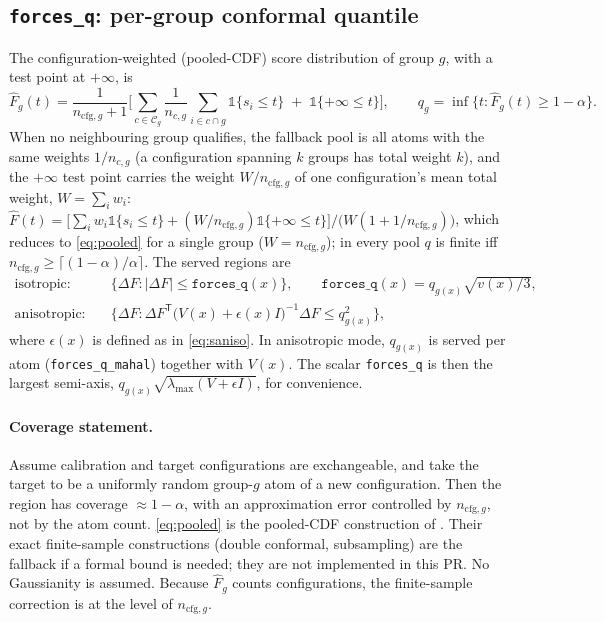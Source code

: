 \documentclass[11pt,a4paper]{article}
\newcommand{\T}{\mathsf{T}}
\newcommand{\ncfg}{n_{\mathrm{cfg},g}}
\newcommand{\code}[1]{\texttt{#1}}
\begin{document}
\subsection{\code{forces\_q}: per-group conformal quantile}
The configuration-weighted (pooled-CDF) score distribution of group $g$, with a test point at
$+\infty$, is
\begin{equation}
\hat F_g(t)=\frac{1}{\ncfg+1}\Bigg[\sum_{c\in\mathcal{C}_g}\frac{1}{n_{c,g}}\sum_{i\in c\cap g}
\mathbb{1}\{s_i\le t\}\;+\;\mathbb{1}\{+\infty\le t\}\Bigg],
\qquad q_g=\inf\{t:\hat F_g(t)\ge1-\alpha\}.
\label{eq:pooled}
\end{equation}
When no neighbouring group qualifies, the fallback pool is all atoms with the same weights $1/n_{c,g}$
(a configuration spanning $k$ groups has total weight $k$), and the $+\infty$ test point carries the weight
$W/\ncfg$ of one configuration's mean total weight, $W=\sum_i w_i$:
$\hat F(t)=\big[\sum_i w_i\mathbb{1}\{s_i\le t\}+(W/\ncfg)\mathbb{1}\{+\infty\le t\}\big]/\big(W(1+1/\ncfg)\big)$,
which reduces to \eqref{eq:pooled} for a single group ($W=\ncfg$); in every pool $q$ is finite iff
$\ncfg\ge\lceil(1-\alpha)/\alpha\rceil$.
The served regions are
\begin{align}
\text{isotropic:}\quad & \{\Delta F: |\Delta F|\le \code{forces\_q}(x)\},\qquad
\code{forces\_q}(x)=q_{g(x)}\sqrt{v(x)/3},\\
\text{anisotropic:}\quad & \big\{\Delta F:\Delta F^\T\big(V(x)+\epsilon(x)I\big)^{-1}\Delta F\le q_{g(x)}^2\big\},
\end{align}
where $\epsilon(x)$ is defined as in \eqref{eq:saniso}. In anisotropic mode, $q_{g(x)}$ is served
per atom (\code{forces\_q\_mahal}) together with $V(x)$. The scalar \code{forces\_q} is then the largest
semi-axis, $q_{g(x)}\sqrt{\lambda_{\max}(V+\epsilon I)}$, for convenience.

\paragraph{Coverage statement.} Assume calibration and target configurations are exchangeable, and
take the target to be a uniformly random group-$g$ atom of a new configuration. Then the region has
coverage $\approx1-\alpha$, with an approximation error controlled by $\ncfg$, not by the atom count.
\eqref{eq:pooled} is the pooled-CDF construction of \cite{dunn2023}. Their exact finite-sample
constructions (double conformal, subsampling) are the fallback if a formal bound is needed; they
are not implemented in this PR. No Gaussianity is assumed. Because $\hat F_g$ counts configurations,
the finite-sample correction is at the level of $\ncfg$.
\end{document}
